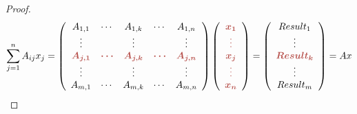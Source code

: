 \begin{proof}
    \begin{equation}\sum\limits _{j=1}^{n} A_{ij} x_{j} =\left(\begin{array}{ c c c c c }
    A_{1,1} & \cdots  & A_{1,k} & \cdots  & A_{1,n}\\
    \vdots  &  & \vdots  &  & \vdots \\
    \boldsymbol{\textcolor[rgb]{0.72,0.33,0.31}{A}\textcolor[rgb]{0.72,0.33,0.31}{_{j,1}}} & \boldsymbol{\textcolor[rgb]{0.72,0.33,0.31}{\cdots }} & \boldsymbol{\textcolor[rgb]{0.72,0.33,0.31}{A}\textcolor[rgb]{0.72,0.33,0.31}{_{j,k}}} & \boldsymbol{\textcolor[rgb]{0.72,0.33,0.31}{\cdots }} & \boldsymbol{\textcolor[rgb]{0.72,0.33,0.31}{A}\textcolor[rgb]{0.72,0.33,0.31}{_{j,n}}}\\
    \vdots  &  & \vdots  &  & \vdots \\
    A_{m,1} & \cdots  & A_{m,k} & \cdots  & A_{m,n}
    \end{array}\right)\left(\begin{array}{ c }
    \boldsymbol{\textcolor[rgb]{0.72,0.33,0.31}{x}\textcolor[rgb]{0.72,0.33,0.31}{_{1}}}\\
    \boldsymbol{\textcolor[rgb]{0.72,0.33,0.31}{\vdots }}\\
    \boldsymbol{\textcolor[rgb]{0.72,0.33,0.31}{x}\textcolor[rgb]{0.72,0.33,0.31}{_{j}}}\\
    \boldsymbol{\textcolor[rgb]{0.72,0.33,0.31}{\vdots }}\\
    \boldsymbol{\textcolor[rgb]{0.72,0.33,0.31}{x}\textcolor[rgb]{0.72,0.33,0.31}{_{n}}}
    \end{array}\right) =\left(\begin{array}{ c }
    Result_{1}\\
    \vdots \\
    \boldsymbol{\textcolor[rgb]{0.72,0.33,0.31}{Result}\textcolor[rgb]{0.72,0.33,0.31}{_{k}}}\\
    \vdots \\
    Result_{m}
    \end{array}\right) =Ax\end{equation}


\end{proof}
